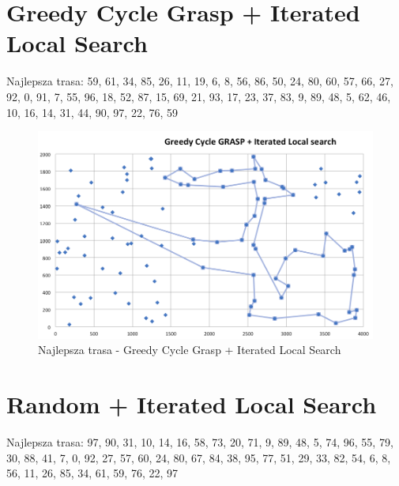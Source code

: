 \documentclass[a4paper 10pt]{article}
\begin{document}
\newpage
\section{Greedy Cycle Grasp + Iterated Local Search}
Najlepsza trasa: 59, 61, 34, 85, 26, 11, 19, 6, 8, 56, 86, 50, 24, 80, 60, 57, 66, 27, 92, 0, 91, 7, 55, 96, 18, 52, 87, 15, 69, 21, 93, 17, 23, 37, 83, 9, 89, 48, 5, 62, 46, 10, 16, 14, 31, 44, 90, 97, 22, 76, 59 

\begin{figure} [H]
\centering
\includegraphics[angle=0,width = 1\textwidth, height=!]{images/GCG_ILS.png}
\caption{Najlepsza trasa - Greedy Cycle Grasp + Iterated Local Search}
\label{Rys. NN}
\end{figure}

\newpage
\section{Random + Iterated Local Search}
Najlepsza trasa: 97, 90, 31, 10, 14, 16, 58, 73, 20, 71, 9, 89, 48, 5, 74, 96, 55, 79, 30, 88, 41, 7, 0, 92, 27, 57, 60, 24, 80, 67, 84, 38, 95, 77, 51, 29, 33, 82, 54, 6, 8, 56, 11, 26, 85, 34, 61, 59, 76, 22, 97 


\newpage
\end{document}
